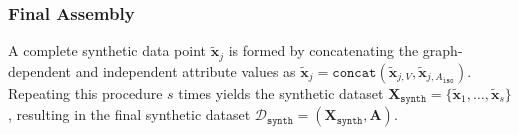 \subsubsection{Final Assembly}

A complete synthetic data point $\tilde{\mathbf{x}}_j$ is formed by concatenating the graph-dependent and independent attribute values as $\tilde{\mathbf{x}}_j = \mathtt{concat}(\tilde{\mathbf{x}}_{j, V}, \tilde{\mathbf{x}}_{j, A_{\mathtt{iso}}})$. Repeating this procedure $s$ times yields the synthetic dataset $\mathbf{X}_{\mathtt{synth}} = \{\tilde{\mathbf{x}}_1, \ldots, \tilde{\mathbf{x}}_s\}$, resulting in the final synthetic dataset $\mathcal{D}_{\mathtt{synth}} = (\mathbf{X}_{\mathtt{synth}}, \mathbf{A})$.

